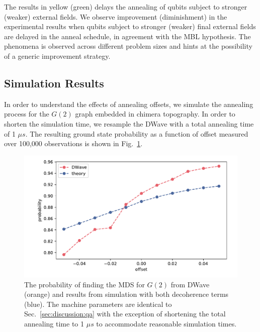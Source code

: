 \documentclass[prd,twocolumn,tightenlines,preprintnumbers,showpacs,superscriptaddress,notitlepage,nofootinbib,eqsecnum,floatfix,longbibliography,aps,10pt]{revtex4-2}
\begin{document}
The results in yellow (green) delays the annealing of qubits subject to stronger (weaker) external fields. We observe improvement (diminishment) in the experimental results when qubits subject to stronger (weaker) final external fields are delayed in the anneal schedule, in agreement with the MBL hypothesis. The phenomena is observed across different problem sizes and hints at the possibility of a generic improvement strategy.


\subsection{Simulation Results}
\label{sec:results:simulation}
In order to understand the effects of annealing offsets, we simulate the annealing process for the $G(2)$ graph embedded in chimera topography.
In order to shorten the simulation time, we resample the DWave with a total annealing time of 1 $\mu s$.
The resulting ground state probability as a function of offset measured over 100,000 observations is shown in Fig.~\ref{fig:dwave1us}.

\begin{figure}
	\centering
	\includegraphics[width=\columnwidth]{./new_figures/NN2_offset_scaling.pdf}
	\caption{The probability of finding the MDS for $G(2)$ from DWave (orange) and results from simulation with both decoherence terms (blue).
     The machine parameters are identical to Sec.~\ref{sec:discussion:qa} with the exception of shortening the total annealing time to 1 $\mu s$ to accommodate reasonable simulation times.}
	\label{fig:dwave1us}
\end{figure}
\end{document}
